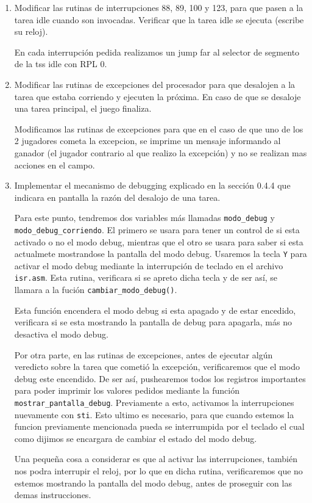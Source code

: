 \documentclass[a4paper]{article}
\begin{document}
\begin{enumerate}[label=\alph*)]
	\item Modificar las rutinas de interrupciones 88, 89, 100 y 123, para que pasen a la tarea idle cuando son invocadas. Verificar que la tarea idle se ejecuta (escribe su reloj).
	
	En cada interrupci\'on pedida realizamos un jump far al selector de segmento de la tss idle con RPL 0.
	
	\item Modificar las rutinas de excepciones del procesador para que desalojen a la tarea que estaba corriendo y ejecuten la próxima. En caso de que se desaloje una tarea principal, el juego finaliza.
	
	Modificamos las rutinas de excepciones para que en el caso de que uno de los 2 jugadores cometa la excepcion, se imprime un mensaje informando al ganador (el jugador contrario al que realizo la excepci\'on) y no se realizan mas acciones en el campo. 
	
	
	\item Implementar el mecanismo de debugging explicado en la sección 0.4.4 que indicara en pantalla la razón del desalojo de una tarea. 
	
	Para este punto, tendremos dos variables m\'as llamadas \texttt{modo\_debug} y \texttt{modo\_debug\_corriendo}. El primero se usara para tener un control de si esta activado o no el modo debug, mientras que el otro se usara para saber si esta actualmete mostrandose la pantalla del modo debug. Usaremos la tecla \texttt{Y} para activar el modo debug mediante la interrupción de teclado en el archivo \texttt{isr.asm}. Esta rutina, verificara si se apreto dicha tecla y de ser as\'i, se llamara a la fuci\'on \texttt{cambiar\_modo\_debug()}.
	
	Esta funci\'on encendera el modo debug si esta apagado y de estar encedido, verificara si se esta mostrando la pantalla de debug para apagarla, m\'as no desactiva el modo debug.
	
	Por otra parte, en las rutinas de excepciones, antes de ejecutar algún veredicto sobre la tarea que cometió la excepci\'on, verificaremos que el modo debug este encendido. De ser así, pushearemos todos los registros importantes para poder imprimir los valores pedidos mediante la funci\'on \texttt{mostrar\_pantalla\_debug}. Previamente a esto, activamos la interrupciones nuevamente con \texttt{sti}. Esto ultimo es necesario, para que cuando estemos la funcion previamente mencionada pueda se interrumpida por el teclado el cual como dijimos se encargara de cambiar el estado del modo debug.
	
	Una peque\~na cosa a considerar es que al activar las interrupciones, también nos podra interrupir el reloj, por lo que en dicha rutina, verificaremos que no estemos mostrando la pantalla del modo debug, antes de proseguir con las demas instrucciones.

\end{enumerate} 
\end{document}
